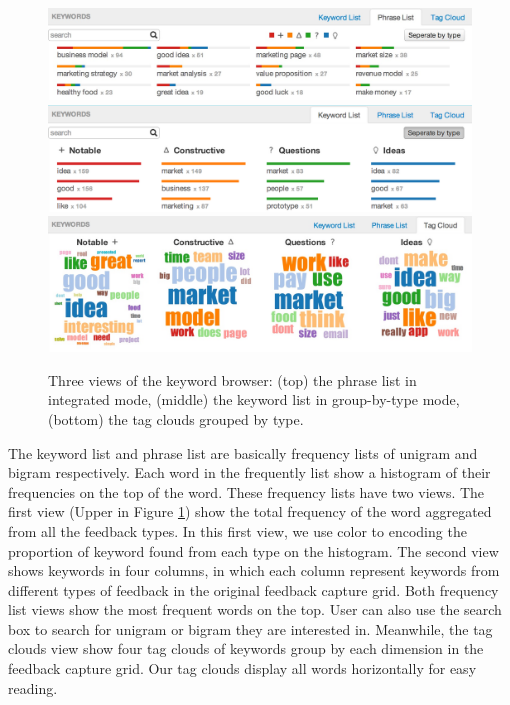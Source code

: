\documentclass{sigchi}
\begin{document}
\begin{figure}[b]
\centering
\includegraphics[width=\columnwidth]{images/phrase-list}
\includegraphics[width=\columnwidth]{images/keyword-list}
\includegraphics[width=\columnwidth]{images/clouds}
\caption{Three views of the keyword browser:
(top) the phrase list in integrated mode,
(middle) the keyword list in group-by-type mode,
(bottom) the tag clouds grouped by type.}
\label{fig:keyword-lists}
\end{figure}

The keyword list and phrase list are basically frequency lists of unigram and
bigram respectively.  Each word in the frequently list show a histogram of their
frequencies on the top of the word.  These frequency lists have two views.  The
first view (Upper in Figure \ref{fig:keyword-lists}) show the total frequency of the
word aggregated from all the feedback types.  In this first view, we use color
to encoding the proportion of keyword found from each type on the histogram.
The second view shows keywords in four columns, in which each column represent
keywords from different types of feedback in the original feedback capture grid.
Both frequency list views show the most frequent words on the top.  User can
also use the search box to search for unigram or bigram they are interested in.
Meanwhile, the tag clouds view show four tag clouds of keywords group by each
dimension in the feedback capture grid.  Our tag clouds display all words
horizontally for easy reading.
\end{document}
